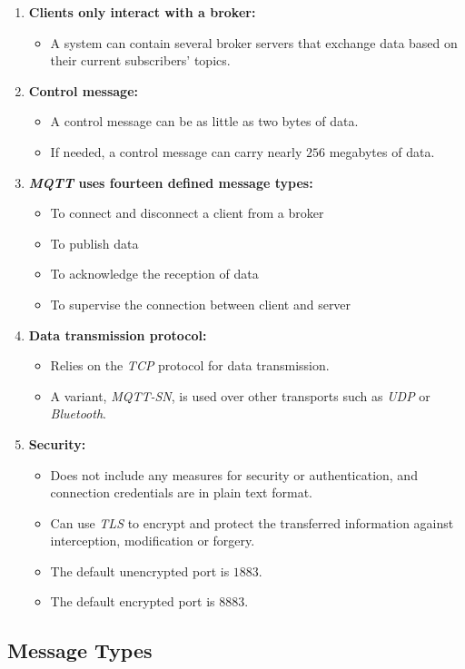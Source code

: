 \documentclass[report.tex]{subfiles}
\begin{document}
\begin{enumerate}
\item \textbf{Clients only interact with a broker:}
\begin{itemize}
\item A system can contain several broker servers that exchange data based on their current subscribers' topics.
\end{itemize}
\item \textbf{Control message:}
\begin{itemize}
\item A control message can be as little as two bytes of data.
\item If needed, a control message can carry nearly $256$ megabytes of data.
\end{itemize}
\item \textbf{\textit{MQTT} uses fourteen defined message types:}
\begin{itemize}
\item To connect and disconnect a client from a broker
\item To publish data
\item To acknowledge the reception of data
\item To supervise the connection between client and server
\end{itemize}
\item \textbf{Data transmission protocol:}
\begin{itemize}
\item Relies on the \textit{TCP} protocol for data transmission. 
\item A variant, \textit{MQTT-SN}, is used over other transports such as \textit{UDP} or \textit{Bluetooth}.
\end{itemize}
\item \textbf{Security:}
\begin{itemize}
\item Does not include any measures for security or authentication, and connection credentials are in plain text format.
\item Can use \textit{TLS} to encrypt and protect the transferred information against interception, modification or forgery.
\item The default unencrypted port is $1883$.
\item The default encrypted port is $8883$.
\end{itemize}
\end{enumerate}

\pagebreak
\subsection{Message Types}
\end{document}
